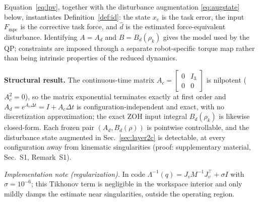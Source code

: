 \documentclass[journal]{IEEEtran}
\newcommand{\Fmpc}{F_{\text{mpc}}}
\begin{document}
Equation~\eqref{eq:lpv}, together with the disturbance augmentation
\eqref{eq:augstate} below, instantiates Definition~\ref{def:id}: the state
$x_e$ is the task error, the input $\Fmpc$ is the corrective task force, and
$\hat d$ is the estimated force-equivalent disturbance. Identifying $A=A_d$
and $B=B_d(\rho_k)$ gives the model used by the QP; constraints are imposed
through a separate robot-specific torque map rather than being intrinsic
properties of the reduced dynamics.

\textbf{Structural result.}
The continuous-time matrix $A_c=\begin{bmatrix}0&I_3\\0&0\end{bmatrix}$
is nilpotent ($A_c^2=0$), so the matrix exponential terminates exactly at
first order and $A_d=e^{A_c\Delta t}=I+A_c\Delta t$ is
configuration-independent and exact, with no discretization
approximation; the exact ZOH input integral $B_d(\rho_k)$ is likewise
closed-form. Each frozen pair $(A_d,B_d(\rho))$ is pointwise controllable,
and the disturbance state augmented in Sec.~\ref{sec:layer2c} is
detectable, at every configuration away from kinematic singularities
(proof: supplementary material, Sec.~S1, Remark~S1).

\textit{Implementation note (regularization).}
In code $\Lambda^{-1}(q)=J_vM^{-1}J_v^\top+\sigma I$ with $\sigma=10^{-6}$; this
Tikhonov term is negligible in the workspace interior and only mildly damps the
estimate near singularities, outside the operating region.
\end{document}
